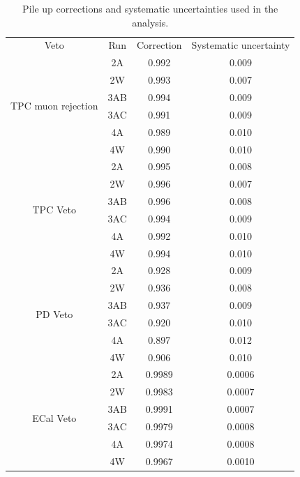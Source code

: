\begin{table}[ht]
  \center
  \begin{tabular}{cccc}
    \toprule
    Veto & Run & Correction & Systematic uncertainty \\
    \cmidrule(r){1-4}
    \multirow{6}{*}{\Gls{TPC} muon rejection} & 2A  & 0.992 & 0.009 \\
         & 2W  & 0.993 & 0.007 \\
         & 3AB & 0.994 & 0.009 \\
         & 3AC & 0.991 & 0.009 \\
         & 4A  & 0.989 & 0.010 \\
         & 4W  & 0.990 & 0.010 \\
    \cmidrule(r){1-4}                        
    \multirow{6}{*}{\Gls{TPC} Veto} & 2A  & 0.995 & 0.008 \\
         & 2W  & 0.996 & 0.007 \\
         & 3AB & 0.996 & 0.008 \\
         & 3AC & 0.994 & 0.009 \\
         & 4A  & 0.992 & 0.010 \\
         & 4W  & 0.994 & 0.010 \\
    \cmidrule(r){1-4}                        
    \multirow{6}{*}{\Gls{PD} Veto} & 2A  & 0.928 & 0.009 \\
         & 2W  & 0.936 & 0.008 \\
         & 3AB & 0.937 & 0.009 \\
         & 3AC & 0.920 & 0.010 \\
         & 4A  & 0.897 & 0.012 \\
         & 4W  & 0.906 & 0.010 \\
    \cmidrule(r){1-4}
    \multirow{6}{*}{\Gls{ECal} Veto} & 2A  & 0.9989 & 0.0006 \\
         & 2W  & 0.9983 & 0.0007 \\
         & 3AB & 0.9991 & 0.0007 \\
         & 3AC & 0.9979 & 0.0008 \\
         & 4A  & 0.9974 & 0.0008 \\
         & 4W  & 0.9967 & 0.0010 \\

    \bottomrule
  \end{tabular}
  \caption[Pile up corrections and systematic uncertainties used in
  the analysis]{Pile up corrections and systematic uncertainties used
    in the analysis.}
  \label{tab:pileup}
\end{table}

